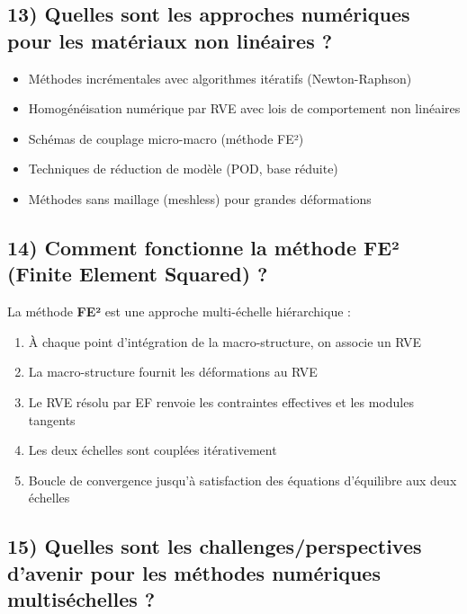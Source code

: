 \documentclass{rapportECL}
\begin{document}
\subsection*{13) Quelles sont les approches numériques pour les matériaux non linéaires ?}

\begin{tcolorbox}[colback=white!5!white,colframe=blue!75!black]
\begin{itemize}[noitemsep]
\item Méthodes incrémentales avec algorithmes itératifs (Newton-Raphson)
\item Homogénéisation numérique par RVE avec lois de comportement non linéaires
\item Schémas de couplage micro-macro (méthode FE²)
\item Techniques de réduction de modèle (POD, base réduite)
\item Méthodes sans maillage (meshless) pour grandes déformations
\end{itemize}
\end{tcolorbox}

\subsection*{14) Comment fonctionne la méthode FE² (Finite Element Squared) ?}

\begin{tcolorbox}[colback=white!5!white,colframe=blue!75!black]
La méthode \textbf{FE²} est une approche multi-échelle hiérarchique :
\begin{enumerate}[noitemsep]
\item À chaque point d'intégration de la macro-structure, on associe un RVE
\item La macro-structure fournit les déformations au RVE
\item Le RVE résolu par EF renvoie les contraintes effectives et les modules tangents
\item Les deux échelles sont couplées itérativement
\item Boucle de convergence jusqu'à satisfaction des équations d'équilibre aux deux échelles
\end{enumerate}
\end{tcolorbox}

\subsection*{15) Quelles sont les challenges/perspectives d'avenir pour les méthodes numériques multiséchelles ?}
\end{document}
